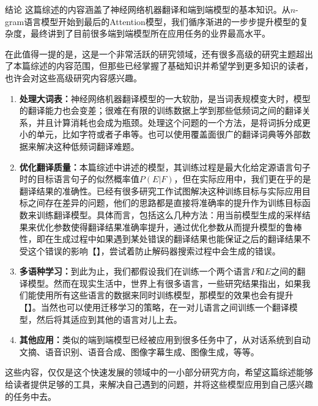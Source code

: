 \documentclass[10pt,a4paper]{ctexart}
\makeatletter
\renewcommand{\section}{\@startsection{section}{1}{0mm}
  {-\baselineskip}{0.5\baselineskip}{\bf\leftline}}
\makeatother
\begin{document}

\section{结论}
这篇综述的内容涵盖了神经网络机器翻译和端到端模型的基本知识。从$n$-gram语言模型开始到最后的Attention模型，我们循序渐进的一步步提升模型的复杂度，最终讲到了目前很多端到端模型所在应用任务的业界最高水平。

在此值得一提的是，这是一个非常活跃的研究领域，还有很多高级的研究主题超出了本篇综述的内容范围，但那些已经掌握了基础知识并希望学到更多知识的读者，也许会对这些高级研究内容感兴趣。

\begin{enumerate}
\item[] \textbf{处理大词表：}神经网络机器翻译模型的一大软肋，是当词表规模变大时，模型的翻译能力也会变差；很难在有限的训练数据上学到那些低频词之间的翻译关系，并且计算消耗也会成为瓶颈。处理这个问题的一个方法，是将词拆分成更小的单元，比如字符或者子串等。也可以使用覆盖面很广的翻译词典等外部数据来解决这种低频词翻译难题。
\item[] \textbf{优化翻译质量：}本篇综述中讲述的模型，其训练过程是最大化给定源语言句子时的目标语言句子的似然概率值$P(E|F)$，但在实际应用中，我们更在乎的是翻译结果的准确性。已经有很多研究工作试图解决这种训练目标与实际应用目标之间存在差异的问题，他们的思路都是直接将准确率的提升作为训练目标函数来训练翻译模型。具体而言，包括这么几种方法：用当前模型生成的采样结果来优化参数使得翻译结果准确率提升，通过优化参数从而提升模型的鲁棒性，即在生成过程中如果遇到某处错误的翻译结果也能保证之后的翻译结果不受这个错误的影响\cite{NIPS2015_5956}【】，尝试着防止解码器搜索过程中会生成的错误。
\item[] \textbf{多语种学习：}到此为止，我们都假设我们在训练一个两个语言$F$和$E$之间的翻译模型。然而在现实生活中，世界上有很多语言，一些研究结果指出，如果我们能使用所有这些语言的数据来同时训练模型，那模型的效果也会有提升【】。当然也可以使用迁移学习的策略，在一对儿语言之间训练一个翻译模型，然后将其适应到其他的语言对儿上去。
\item[] \textbf{其他应用：}类似的端到端模型已经被应用到很多任务中了，从对话系统到自动文摘、语音识别、语音合成、图像字幕生成、图像生成，等等。
\end{enumerate}

这些内容，仅仅是这个快速发展的领域中的一小部分研究方向，希望这篇综述能够给读者提供足够的工具，来解决自己遇到的问题，并将这些模型应用到自己感兴趣的任务中去。

\newpage

\begin{appendix}


\end{appendix}
\end{document}
